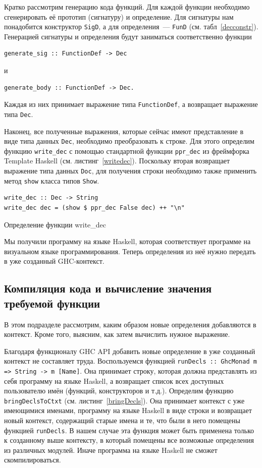 		Кратко рассмотрим генерацию кода функций. Для каждой функции необходимо сгенерировать её прототип (сигнатуру) и определение. Для сигнатуры нам понадобится конструктор \lstinline!SigD!, а для определения~--- \lstinline!FunD! (см. табл~\ref{decconstr}). Генерацией сигнатуры и определения будут заниматься соответственно функции 
		\begin{lstlisting}
generate_sig :: FunctionDef -> Dec
		\end{lstlisting}
		и
		\begin{lstlisting}
generate_body :: FunctionDef -> Dec.
		\end{lstlisting}		
		Каждая из них принимает выражение типа \lstinline!FunctionDef!, а возвращает выражение типа \lstinline!Dec!.		

		Наконец, все полученные выражения, которые сейчас имеют представление в виде типа данных \lstinline!Dec!, необходимо преобразовать к строке. Для этого определим функцию \lstinline!write_dec! с помощью стандартной функции \lstinline!ppr_dec! из фреймфорка Template Haskell (см. листинг~\ref{writedec}). Поскольку вторая возвращает выражение типа данных \lstinline!Doc!, для получения строки необходимо также применить метод \lstinline!show! класса типов \lstinline!Show!.

\begin{ListingEnv}[h]
	\begin{lstlisting}
write_dec :: Dec -> String
write_dec dec = (show $ ppr_dec False dec) ++ "\n"
	\end{lstlisting}
	\caption{Определение функции write\_dec}\label{writedec}
\end{ListingEnv}		

		Мы получили программу на языке Haskell, которая соответствует программе на визуальном языке программирования. Теперь определения из неё нужно передать в уже созданный GHC-контекст.

	\subsection{Компиляция кода и вычисление значения требуемой функции}\label{basefuns}
		В этом подразделе рассмотрим, каким образом новые определения добавляются в контекст. Кроме того, выясним, как затем вычислить нужное выражение.
		
		Благодаря функционалу GHC API добавить новые определение в уже созданный контекст не составляет труда. Воспользуемся функцией \lstinline!runDecls :: GhcMonad m => String -> m [Name]!. Она принимает строку, которая должна представлять из себя программу на языке Haskell, а возвращает список всех доступных пользователю имён (функций, конструкторов и т.д.). Определим функцию \lstinline!bringDeclsToCtxt! (см. листинг~\ref{bringDecls}). Она принимает контекст с уже имеющимися именами, программу на языке Haskell в виде строки и возвращает новый контекст, содержащий старые имена и те, что были в него помещены функцией \lstinline!runDecls!. В нашем случае эта функция может быть применена только к созданному выше контексту, в который помещены все возможные определения из различных модулей. Иначе программа на языке Haskell не сможет скомпилироваться.
		
